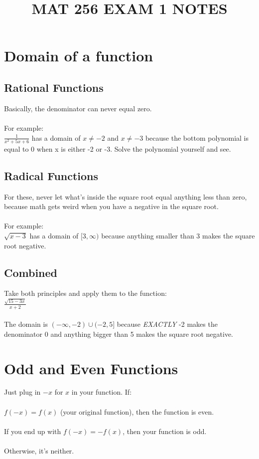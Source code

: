 \documentclass{article}
\begin{document}
\title{MAT 256 EXAM 1 NOTES}
\maketitle

\section{Domain of a function}

\subsection{Rational Functions}
Basically, the denominator can never equal zero.\\
\\
For example:\\
$\frac{1}{x^2+5x+6}$ has a domain of $x \neq -2$ and $x \neq -3$ because the bottom polynomial is equal to 0 when x is either -2 or -3. Solve the polynomial yourself and see.

\subsection{Radical Functions}
For these, never let what's inside the square root equal anything less than zero, because math gets weird when you have a negative in the square root.\\
\\
For example:\\
$\sqrt{x-3}$ has a domain of $[3, \infty)$ because anything smaller than 3 makes the square root negative.

\subsection{Combined}
Take both principles and apply them to the function:\\
$\frac{\sqrt{15-3x}}{x+2}$\\
\\
The domain is $(-\infty, -2) \cup (-2, 5]$ because \textit{EXACTLY} -2 makes the denominator 0 and anything bigger than 5 makes the square root negative.

\section{Odd and Even Functions}
Just plug in $-x$ for $x$ in your function. If:\\
\\
$f(-x) = f(x)$ (your original function), then the function is even.\\
\\
If you end up with $f(-x) = -f(x)$, then your function is odd.\\
\\
Otherwise, it's neither.
\end{document}

